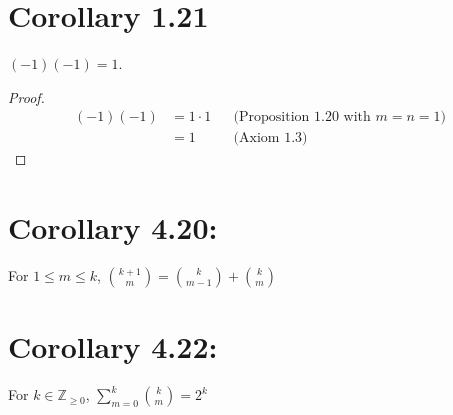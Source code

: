 \section*{Corollary 1.21}
$(-1)(-1) = 1$.
\begin{proof}
  \begin{align*}
    (-1)(-1) & = 1 \cdot 1 &  & \text{(Proposition 1.20 with $m = n = 1$)} \\
             & = 1         &  & \text{(Axiom 1.3)}
  \end{align*}
\end{proof}

\section*{Corollary 4.20:}
For $1 \leq m \leq k$,
$\binom{k+1}{m} = \binom{k}{m-1} + \binom{k}{m}$

\section*{Corollary 4.22:}
For $k \in \mathbb{Z}_{\geq 0}$,
$\displaystyle\sum_{m=0}^{k} \binom{k}{m} = 2^k$